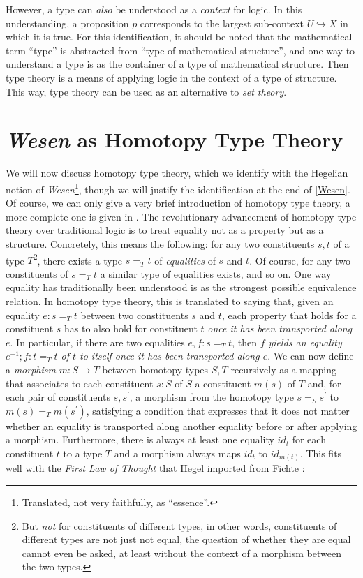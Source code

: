 \documentclass{article}
\begin{document}
However, a type can \emph{also} be understood as a \emph{context} for logic.  In this understanding, a proposition $p$ corresponds to the largest sub-context $U\hookrightarrow X$ in which it is true. For this identification, it should be noted that the mathematical term ``type'' is abstracted from ``type of mathematical structure'', and one way to understand a type is as the container of a type of mathematical structure. Then type theory is a means of applying logic in the context of a type of structure. This way, type theory can be used as an alternative to \emph{set theory}.


\section{\emph{Wesen} as Homotopy Type Theory}\label{Hott}
We will now discuss homotopy type theory, which we identify with the Hegelian notion of \emph{Wesen}\footnote{Translated, not very faithfully, as ``essence''.}, though we will justify the identification at the end of \ref{Wesen}. Of course, we can only give a very brief introduction of homotopy type theory, a more complete one is given in \cite{Shuhott}. The revolutionary advancement of homotopy type theory over traditional logic is to treat equality not as a property but as a structure. Concretely, this means the following: for any two constituents $s,t$ of a type $T$\footnote{But \emph{not} for constituents of different types, in other words, constituents of different types are not just not equal, the question of whether they are equal cannot even be asked, at least without the context of a morphism between the two types.}, there exists a type $s=_T t$ of \emph{equalities} of $s$ and $t$. Of course, for any two constituents of $s=_T t$ a similar type of equalities exists, and so on. One way equality has traditionally been understood is as the strongest possible equivalence relation. In homotopy type theory, this is translated to saying that, given an equality $e:s=_T t$ between two constituents $s$ and $t$, each property that holds for a constituent $s$ has to also hold for constituent $t$ \emph{once it has been transported along $e$}. In particular, if there are two equalities $e,f:s=_T t$, then \emph{$f$ yields an equality $e^{-1};f:t=_T t$ of $t$ to itself once it has been transported along $e$}. We can now define a \emph{morphism} $m:S\rightarrow T$ between homotopy types $S,T$ recursively as a mapping that associates to each constituent $s:S$ of $S$ a constituent $m(s)$ of $T$ and, for each pair of constituents $s,s^{\prime}$, a morphism from the homotopy type $s=_{S} s^{\prime}$ to $m(s)=_T m(s^{\prime})$, satisfying a condition that expresses that it does not matter whether an equality is transported along another equality before or after applying a morphism. Furthermore, there is always at least one equality $id_t$ for each constituent $t$ to a type $T$ and a morphism always maps $id_t$ to $id_{m(t)}$. This fits well with the \emph{First Law of Thought} that Hegel imported from Fichte \cite{Fichte}:
\end{document}
